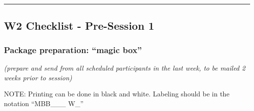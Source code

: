 \documentclass[
]{book}
\begin{document}
\begin{center}\rule{0.5\linewidth}{0.5pt}\end{center}

\hypertarget{w2-checklist---pre-session-1}{%
\subsection{W2 Checklist - Pre-Session 1}\label{w2-checklist---pre-session-1}}

\hypertarget{package-preparation-magic-box-1}{%
\subsubsection{Package preparation: ``magic box''}\label{package-preparation-magic-box-1}}

\emph{(prepare and send from all scheduled participants in the last week, to be mailed 2 weeks prior to session)}

NOTE: Printing can be done in black and white. Labeling should be in the notation ``MBB\_\_\_ W\_''
\end{document}
